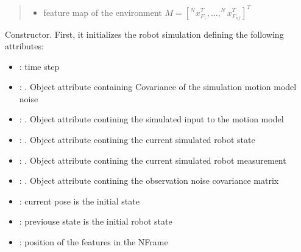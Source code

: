 \documentclass[letterpaper,10pt,english]{sphinxmanual}
\begin{document}
\begin{fulllineitems}
\begin{fulllineitems}
\begin{quote}
\begin{description}
\begin{itemize}
\item {} 
\sphinxAtStartPar
{} \textendash{} feature map of the environment \(M=[^Nx_{F_1}^T,...,^Nx_{F_{nf}}^T]^T\)

\end{itemize}

\end{description}\end{quote}

\sphinxAtStartPar
Constructor. First, it initializes the robot simulation defining the following attributes:
\begin{itemize}
\item {} 
\sphinxAtStartPar
{} : time step

\item {} 
\sphinxAtStartPar
{} : . Object attribute containing Covariance of the simulation motion model noise

\item {} 
\sphinxAtStartPar
{} : . Object attribute contining the simulated input to the motion model

\item {} 
\sphinxAtStartPar
{} : . Object attribute contining the current simulated robot state

\item {} 
\sphinxAtStartPar
{} : . Object attribute contining the current simulated robot measurement

\item {} 
\sphinxAtStartPar
{} : . Object attribute contining the observation noise covariance matrix

\item {} 
\sphinxAtStartPar
{} : current pose is the initial state

\item {} 
\sphinxAtStartPar
{} : previouse state is the initial robot state

\item {} 
\sphinxAtStartPar
{} : position of the features in the N\sphinxhyphen{}Frame


\end{itemize}
\end{fulllineitems}
\end{fulllineitems}
\end{document}
